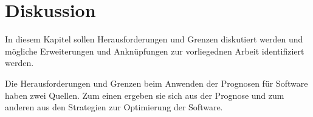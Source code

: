 
%
%

%
%



\chapter{Diskussion}\label{CAP:discussion}
In diesem Kapitel sollen Herausforderungen und Grenzen diskutiert werden und mögliche Erweiterungen und Anknüpfungen zur vorliegednen Arbeit identifiziert werden.

Die Herausforderungen und Grenzen beim Anwenden der Prognosen für Software haben zwei Quellen.
Zum einen ergeben sie sich aus der Prognose und zum anderen aus den Strategien zur Optimierung der Software.

